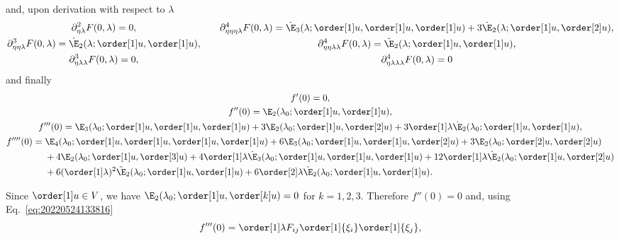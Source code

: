 and, upon derivation with respect to $\lambda$
\begin{equation*}
  \begin{gathered}
    \partial_{\eta\lambda}^2 F(0, \lambda) = 0,\\
    \partial_{\eta\eta\lambda}^3 F(0, \lambda) = \dot{\E}_2(\lambda; \order[1]u, \order[1]u),\\
    \partial_{\eta\lambda\lambda}^3 F(0, \lambda) = 0,\\
  \end{gathered}
  \qquad
  \begin{gathered}
    \partial_{\eta\eta\eta\lambda}^4 F(0, \lambda) = \dot{\E}_3(\lambda; \order[1]u, \order[1]u, \order[1]u) + 3\dot{\E}_2(\lambda; \order[1]u, \order[2]u),\\
    \partial_{\eta\eta\lambda\lambda}^4 F(0, \lambda) = \ddot{\E}_2(\lambda; \order[1]u, \order[1]u),\\
    \partial_{\eta\lambda\lambda\lambda}^4 F(0, \lambda) = 0
  \end{gathered}
\end{equation*}
and finally
\begin{gather}
  f'(0) = 0,\\
  f''(0) = \E_2(\lambda_0; \order[1]u, \order[1]u),\\
  f'''(0) =\E_3(\lambda_0; \order[1]u, \order[1]u, \order[1]u) + 3\E_2(\lambda_0; \order[1]u, \order[2]u) + 3\order[1]\lambda \dot{\E}_2(\lambda_0; \order[1]u, \order[1]u),\\
  \label{eq:20220905063614}
  \begin{aligned}[b]
    f''''(0) ={}
    & \E_4(\lambda_0; \order[1]u, \order[1]u, \order[1]u, \order[1]u) + 6\E_3(\lambda_0; \order[1]u, \order[1]u, \order[2]u) + 3\E_2(\lambda_0; \order[2]u, \order[2]u)\\
    & + 4\E_2(\lambda_0; \order[1]u, \order[3]u) + 4 \order[1]\lambda \dot{\E}_3(\lambda_0; \order[1]u, \order[1]u, \order[1]u) + 12 \order[1]\lambda \dot{\E}_2(\lambda_0; \order[1]u, \order[2]u)\\
    & + 6( \order[1]\lambda )^2 \ddot{\E}_2(\lambda_0; \order[1]u, \order[1]u) + 6\order[2]\lambda \dot{\E}_2(\lambda_0; \order[1]u, \order[1]u).
  \end{aligned}
\end{gather}

Since $\order[1]u \in V$, we have $\E_2(\lambda_0; \order[1]u, \order[k]u) = 0$ for $k = 1, 2, 3$. Therefore $f''(0)=0$
and, using Eq.~\eqref{eq:20220524133816}
\begin{equation}
  \label{eq:20220601055448}
  f'''(0) = \order[1]\lambda F_{ij} \order[1]{\xi_i} \order[1]{\xi_j},
\end{equation}


